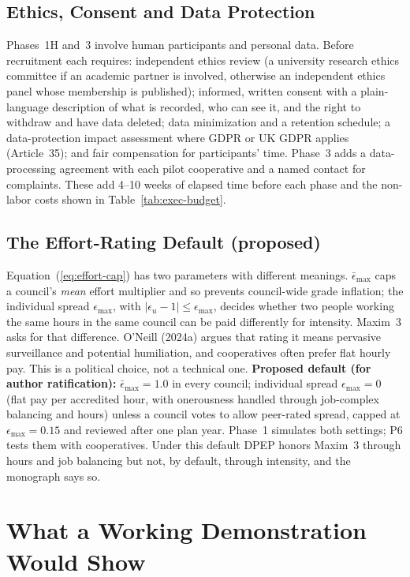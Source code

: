 \documentclass[10pt,twoside,openany]{book}
\theoremstyle{dpepstyle}
\begin{document}
\subsection{Ethics, Consent and Data Protection}
\label{sec:ethics}
Phases~1H and~3 involve human participants and personal data. Before recruitment each requires: independent ethics review (a university research ethics committee if an academic partner is involved, otherwise an independent ethics panel whose membership is published); informed, written consent with a plain-language description of what is recorded, who can see it, and the right to withdraw and have data deleted; data minimization and a retention schedule; a data-protection impact assessment where GDPR or UK GDPR applies (Article~35); and fair compensation for participants' time. Phase~3 adds a data-processing agreement with each pilot cooperative and a named contact for complaints. These add 4--10 weeks of elapsed time before each phase and the non-labor costs shown in Table~\ref{tab:exec-budget}.

\subsection{The Effort-Rating Default (proposed)}
\label{sec:effort-default}
Equation~(\ref{eq:effort-cap}) has two parameters with different meanings. $\bar\epsilon_{\max}$ caps a council's \emph{mean} effort multiplier and so prevents council-wide grade inflation; the individual spread $\epsilon_{\max}$, with $|\epsilon_u - 1| \le \epsilon_{\max}$, decides whether two people working the same hours in the same council can be paid differently for intensity. Maxim~3 asks for that difference. O'Neill (2024a) argues that rating it means pervasive surveillance and potential humiliation, and cooperatives often prefer flat hourly pay. This is a political choice, not a technical one. \textbf{Proposed default (for author ratification):} $\bar\epsilon_{\max} = 1.0$ in every council; individual spread $\epsilon_{\max} = 0$ (flat pay per accredited hour, with onerousness handled through job-complex balancing and hours) unless a council votes to allow peer-rated spread, capped at $\epsilon_{\max} = 0.15$ and reviewed after one plan year. Phase~1 simulates both settings; P6 tests them with cooperatives. Under this default DPEP honors Maxim~3 through hours and job balancing but not, by default, through intensity, and the monograph says so.

\section{What a Working Demonstration Would Show}
\label{sec:demo}
\end{document}
